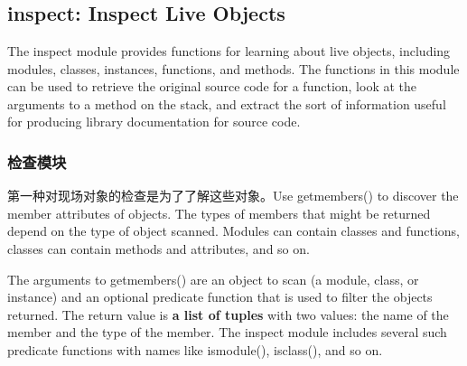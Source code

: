 \chapter{\label{ch18}}
\section{inspect: Inspect Live Objects}
The inspect module provides functions for learning about live objects, including modules, classes, instances, functions, and methods. The functions in this module can be used to retrieve the original source code for a function, look at the arguments to a method on the stack, and extract the sort of information useful for producing library documentation for source code.
\subsection{检查模块}
第一种对现场对象的检查是为了了解这些对象。Use getmembers() to discover the member attributes of objects. The types of members that might be returned depend on the type of object scanned. Modules can contain classes and functions, classes can contain methods and attributes, and so on.

The arguments to getmembers() are an object to scan (a module, class, or instance) and an optional predicate function that is used to filter the objects returned. The return value is \textbf{a list of tuples} with two values: the name of the member and the type of the member. The inspect module includes several such predicate functions with names like ismodule(), isclass(), and so on.